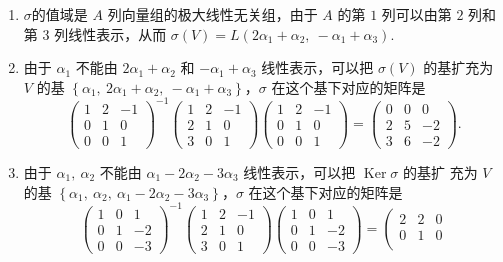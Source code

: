 \begin{solution}
\begin{enumerate}
        \item  $\sigma$的值域是 $A$ 列向量组的极大线性无关组，由于 $A $ 的第 $1$ 列可以由第 $2$ 列和第 $3$ 列线性表示，从而 $\sigma(V)=L\left(2 \alpha_{1}+\alpha_{2},\ -\alpha_{1}+\alpha_{3}\right)$.

        \item 由于 $\alpha_{1}$ 不能由 $2 \alpha_{1}+\alpha_{2}$ 和 $-\alpha_{1}+\alpha_{3}$ 线性表示，可以把 $\sigma(V)$ 的基扩充为 $V$ 的基 $\left\{\alpha_{1},\ 2 \alpha_{1}+\alpha_{2},\ -\alpha_{1}+\alpha_{3}\right\}$，$\sigma$ 在这个基下对应的矩阵是
        \[\left(\begin{array}{ccc}
        1 & 2 & -1 \\
        0 & 1 & 0 \\
        0 & 0 & 1
        \end{array}\right)^{-1}\left(\begin{array}{ccc}
        1 & 2 & -1 \\
        2 & 1 & 0 \\
        3 & 0 & 1
        \end{array}\right)\left(\begin{array}{ccc}
        1 & 2 & -1 \\
        0 & 1 & 0 \\
        0 & 0 & 1
        \end{array}\right)=\left(\begin{array}{ccc}
        0 & 0 & 0 \\
        2 & 5 & -2 \\
        3 & 6 & -2
        \end{array}\right).\]

        \item 由于 $\alpha_{1},\ \alpha_{2}$ 不能由 $\alpha_{1}-2 \alpha_{2}-3 \alpha_{3}$ 线性表示，可以把 $\operatorname{Ker} \sigma$ 的基扩 充为 $V$ 的基 $\left\{\alpha_{1},\ \alpha_{2},\ \alpha_{1}-2 \alpha_{2}-3 \alpha_{3}\right\}$，$\sigma$ 在这个基下对应的矩阵是
        \[\left(\begin{array}{ccc}
            1 & 0 & 1 \\
            0 & 1 & -2 \\
            0 & 0 & -3
            \end{array}\right)^{-1}\left(\begin{array}{ccc}
            1 & 2 & -1 \\
            2 & 1 & 0 \\
            3 & 0 & 1
            \end{array}\right)\left(\begin{array}{ccc}
            1 & 0 & 1 \\
            0 & 1 & -2 \\
            0 & 0 & -3
            \end{array}\right)=\left(\begin{array}{ccc}
            2 & 2 & 0 \\
            0 & 1 & 0 \\


\end{array}\]
\end{enumerate}
\end{solution}
